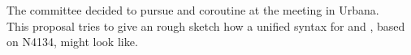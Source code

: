 The committee decided to pursue \sless and \sfull coroutine at the meeting in
Urbana.\\
This proposal tries to give an rough sketch how a unified syntax for \sless and
\sfcoros, based on N4134\cite{N4134}, might look like.

